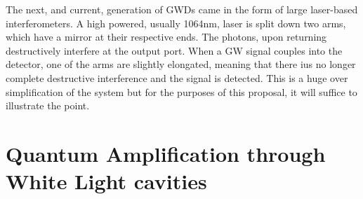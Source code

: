 \documentclass[aps,
                pra,  
                a4paper, 
                amsmath, 
                amssymb, 
                preprint,
                amsfonts,
                nofootinbib,
                titlepage
            ]{revtex4-2}
\begin{document}
    \par
    The next, and current, generation of GWDs came in the form of large laser-based interferometers. A high powered, usually 1064nm, laser is split down two arms, which have a mirror at their respective ends. The photons, upon returning destructively interfere at the output port. When a GW signal couples into the detector, one of the arms are slightly elongated, meaning that there ius no longer complete destructive interference and the signal is detected. This is a huge over simplification of the system but for the purposes of this proposal, it will suffice to illustrate the point. 

\section{Quantum Amplification through White Light cavities}
\end{document}
